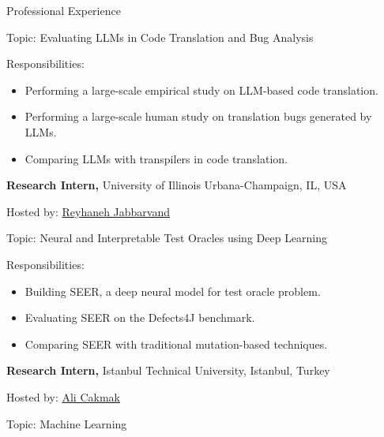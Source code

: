 \begin{rubric}{Professional Experience}
        \par Topic: Evaluating LLMs in Code Translation and Bug Analysis

        \par Responsibilities:

        \begin{itemize}[leftmargin=*, noitemsep, topsep=0pt]

            \item Performing a large-scale empirical study on LLM-based code translation.

            \item Performing a large-scale human study on translation bugs generated by LLMs.

            \item Comparing LLMs with transpilers in code translation.

        \end{itemize}
\entry*[05/21 -- 08/22]%
	\textbf{Research Intern,} University of Illinois Urbana-Champaign, IL, USA
        
        \par Hosted by: \href{https://reyhaneh.cs.illinois.edu/}{Reyhaneh Jabbarvand}
        
        \par Topic: Neural and Interpretable Test Oracles using Deep Learning

        \par Responsibilities:

        \begin{itemize}[leftmargin=*, noitemsep, topsep=0pt]

            \item Building SEER, a deep neural model for test oracle problem.

            \item Evaluating SEER on the Defects4J benchmark.

            \item Comparing SEER with traditional mutation-based techniques.

        \end{itemize}
\entry*[06/19 -- 02/22]%
	\textbf{Research Intern,} Istanbul Technical University, Istanbul, Turkey

        \par Hosted by: \href{https://web.itu.edu.tr/alicakmak/}{Ali Cakmak}
        
        \par Topic: Machine Learning


\end{rubric}

